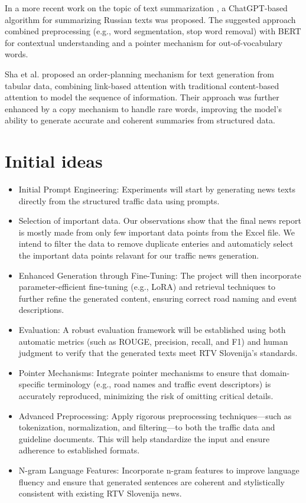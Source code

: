 \documentclass[fleqn,moreauthors,10pt]{ds_report}
\begin{document}
In a more recent work on the topic of text summarization \cite{houAlgorithmAutomaticAbstract2024}, a ChatGPT-based
algorithm for summarizing Russian texts was proposed. The suggested approach combined preprocessing (e.g., word segmentation,
stop word removal) with BERT for contextual understanding and a pointer mechanism for out-of-vocabulary
words.

Sha et al. \cite{sha2018order} proposed an order-planning mechanism for text generation from tabular data, combining
link-based attention with traditional content-based attention to model the sequence of information. Their approach
was further enhanced by a copy mechanism to handle rare words, improving the model's ability to generate accurate
and coherent summaries from structured data.

\section{Initial ideas}
\begin{itemize}
    \item Initial Prompt Engineering: Experiments will start by generating news texts directly from the structured traffic data using prompts.
    
    \item Selection of important data. Our observations show that the final news report is mostly made from only few important data points from the Excel file. We intend to filter the data to remove duplicate enteries and automaticly select the important data points relavant for our traffic news generation.
    
    \item Enhanced Generation through Fine-Tuning: The project will then incorporate parameter-efficient fine-tuning (e.g., LoRA) and retrieval techniques to further refine the generated content, ensuring correct road naming and event descriptions.
    
    \item Evaluation: A robust evaluation framework will be established using both automatic metrics (such as ROUGE, precision, recall, and F1) and human judgment to verify that the generated texts meet RTV Slovenija's standards.

    \item Pointer Mechanisms: Integrate pointer mechanisms to ensure that domain-specific terminology (e.g., road names and traffic event descriptors) is accurately reproduced, minimizing the risk of omitting critical details.

    \item Advanced Preprocessing: Apply rigorous preprocessing techniques—such as tokenization, normalization, and filtering—to both the traffic data and guideline documents. This will help standardize the input and ensure adherence to established formats.

    \item N-gram Language Features: Incorporate n-gram features to improve language fluency and ensure that generated sentences are coherent and stylistically consistent with existing RTV Slovenija news.

    \end{itemize}
\end{document}

